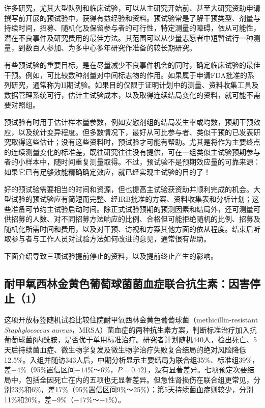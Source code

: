 许多研究，尤其大型队列和临床试验，可以从主研究开始前、甚至大研究资助申请撰写前开展的预试验中，获得有益经验和资料。预试验常是了解干预类型、剂量与持续时间，招募、随机化及保留参与者的可行性，特定测量的障碍，依从可能性，潜在不良事件及研究费用的最佳方法。其范围可以从少量志愿者中短暂试行一种测量，到数百人参加、为多中心多年研究作准备的较长期研究。

有些预试验的重要目标，是在尽量减少不良事件机会的同时，确定临床试验的最佳干预。例如，可比较数种剂量对中间标志物的作用。如果属于申请FDA批准的系列研究，通常称为II期试验。如果目的仅限于证明计划中的测量、资料收集工具及数据管理系统可行，估计主试验成本，以及取得连续结局变化的资料，就可能不需要对照组。

预试验有时用于估计样本量参数，例如安慰剂组的结局发生率或均数，预期干预效应，以及统计变异程度。但多数情况下，最好从可比参与者、类似干预的已发表研究取得这些估计；没有这些资料时，预试验才可能有帮助。尤其是将作为主要终点的连续测量变化的标准差，既往研究往往没有提供，可在一组类似主试验预期参与者的小样本中，随时间重复测量取得。不过，预试验不是预期效应量的可靠来源：如果它已有足够效能精确确定效应，就已经实现主试验的目的了！

好的预试验需要相当的时间和资源，但也提高主试验获资助并顺利完成的机会。大型试验的预试验应有简短而完整、经IRB批准的方案、资料收集表和分析计划；这些准备可节约主试验启动时间。除正式试验预期的预测因素和结局外，还可测量可供招募的人数、对不同招募方法响应的比例、合格但可能拒绝随机的比例、招募及随机化所需时间和费用，以及对干预、访视和方案其他方面的依从程度。结束后听取参与者与工作人员对试验方法如何改进的意见，通常很有帮助。

下面介绍导致三项试验提前停止的资料，以及提前终止产生的影响。

\subsection{耐甲氧西林金黄色葡萄球菌菌血症联合抗生素：因害停止（1）}
这项开放标签随机试验比较住院耐甲氧西林金黄色葡萄球菌（methicillin-resistant \textit{Staphylococcus aureus}，MRSA）菌血症的两种抗生素方案，判断标准治疗加入抗葡萄球菌β内酰胺，是否优于单用标准治疗。研究者计划随机440人，检出死亡、5天后持续菌血症、微生物学复发及微生物学治疗失败复合结局的绝对风险降低12.5\%。入组并随访343人后，中期分析显示主要结局为联合组35\%、标准组39\%，差$-4\%$（95\%置信区间$-14\%$～6\%，$P=0.42$），没有显著差异。七项预定次要结局中，包括全因死亡在内的五项也无显著差异。但急性肾损伤在联合组更常见，分别23\%和6\%，差17\%（95\%置信区间9\%～25\%）；第5天持续菌血症则较少，分别11\%和20\%，差$-9\%$（$-17\%$～$-1\%$）。

